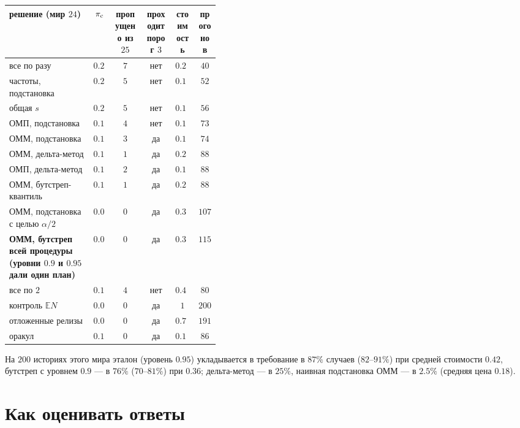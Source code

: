 \documentclass[11pt,a4paper]{article}
\newcommand{\E}{\mathbb{E}}
\theoremstyle{plain}
\theoremstyle{definition}
\begin{document}
\begin{center}\small
\begin{tabular}{@{}p{0.40\linewidth}ccccc@{}}
\toprule
решение (мир $24$) & $\pi_{\rm c}$ & \thead{пропущено\\из $25$} & \thead{проходит\\порог $3$} & стоимость & прогонов \\
\midrule
все по разу & $0.256$ & $7$ & нет & $0.20$ & $40$ \\
частоты, подстановка & $0.277$ & $5$ & нет & $0.10$ & $52$ \\
общая $s$ & $0.213$ & $5$ & нет & $0.12$ & $56$ \\
ОМП, подстановка & $0.174$ & $4$ & нет & $0.15$ & $73$ \\
ОММ, подстановка & $0.166$ & $3$ & да & $0.15$ & $74$ \\
ОММ, дельта-метод & $0.122$ & $1$ & да & $0.20$ & $88$ \\
ОМП, дельта-метод & $0.126$ & $2$ & да & $0.19$ & $88$ \\
ОММ, бутстреп-квантиль & $0.122$ & $1$ & да & $0.20$ & $88$ \\
ОММ, подстановка с целью $\alpha/2$ & $0.080$ & $0$ & да & $0.30$ & $107$ \\
\textbf{ОММ, бутстреп всей процедуры (уровни $0.9$ и $0.95$ дали один план)} & $0.065$ & $0$ & да & $0.35$ & $115$ \\
все по $2$ & $0.108$ & $4$ & нет & $0.40$ & $80$ \\
контроль $\E N$ & $0.015$ & $0$ & да & $1$ & $200$ \\
отложенные релизы & $0.021$ & $0$ & да & $0.71$ & $191$ \\
оракул & $0.100$ & $0$ & да & $0.18$ & $86$ \\
\bottomrule
\end{tabular}
\end{center}

На $200$ историях этого мира эталон (уровень $0.95$) укладывается в требование в $87\%$ случаев ($82$--$91\%$) при средней стоимости $0.42$, бутстреп с уровнем $0.9$ --- в $76\%$ ($70$--$81\%$) при $0.36$; дельта-метод --- в $25\%$, наивная подстановка ОММ --- в $2.5\%$ (средняя цена $0.18$).

\section{Как оценивать ответы}
\end{document}
